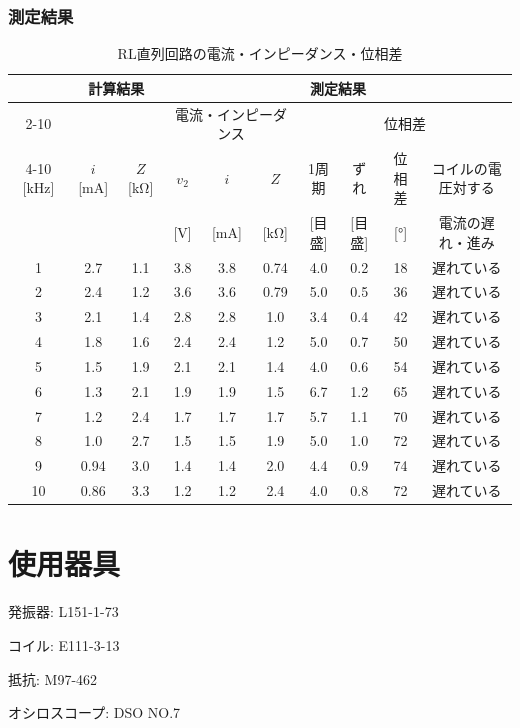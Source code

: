 \documentclass[a4paper]{jarticle}
\begin{document}
			\subsubsection{測定結果}
				\begin{table}[h]
					\centering
					\small
					\caption{RL直列回路の電流・インピーダンス・位相差}
					\begin{tabular}{c|c|c|c|c|c|c|c|c|c}\hline\hline
						 & \multicolumn{2}{c|}{計算結果} & \multicolumn{7}{c}{測定結果} \\ \cline{2-10}
						\multicolumn{1}{c|}{周波数} & & &\multicolumn{3}{c|}{電流・インピーダンス} & \multicolumn{4}{c}{位相差} \\ \cline{4-10}
						[kHz] & $i$ [mA] & $Z$ [kΩ] & $v_{2}$ & $i$ & $Z$ & 1周期 & ずれ  & 位相差 & コイルの電圧対する \\
						 & & & [V] & [mA] & [kΩ] & [目盛] & [目盛] & [°] & 電流の遅れ・進み \\ \hline
						1 & 2.7 & 1.1 & 3.8 & 3.8 & 0.74 & 4.0 & 0.2 & 18 & 遅れている \\
						2 & 2.4 & 1.2 & 3.6 & 3.6 & 0.79 & 5.0 & 0.5 & 36 & 遅れている \\
						3 & 2.1 & 1.4 & 2.8 & 2.8 & 1.0 & 3.4 & 0.4 & 42 & 遅れている \\
						4 & 1.8 & 1.6 & 2.4 & 2.4 & 1.2 & 5.0 & 0.7 & 50 & 遅れている \\
						5 & 1.5 & 1.9 & 2.1 & 2.1 & 1.4 & 4.0 & 0.6 & 54 & 遅れている \\
						6 & 1.3 & 2.1 & 1.9 & 1.9 & 1.5 & 6.7 & 1.2 & 65 & 遅れている \\
						7 & 1.2 & 2.4 & 1.7 & 1.7 & 1.7 & 5.7 & 1.1 & 70 & 遅れている \\
						8 & 1.0 & 2.7 & 1.5 & 1.5 & 1.9 & 5.0 & 1.0 & 72 & 遅れている \\
						9 & 0.94 & 3.0 & 1.4 & 1.4 & 2.0 & 4.4 & 0.9 & 74 & 遅れている \\
						10 & 0.86 & 3.3 & 1.2 & 1.2 & 2.4 & 4.0 & 0.8 & 72 & 遅れている \\ \hline
					\end{tabular}
				\end{table}
	\section{使用器具}
		発振器: L151-1-73 \par
		コイル: E111-3-13 \par
		抵抗: M97-462 \par
		オシロスコープ: DSO NO.7
\end{document}

